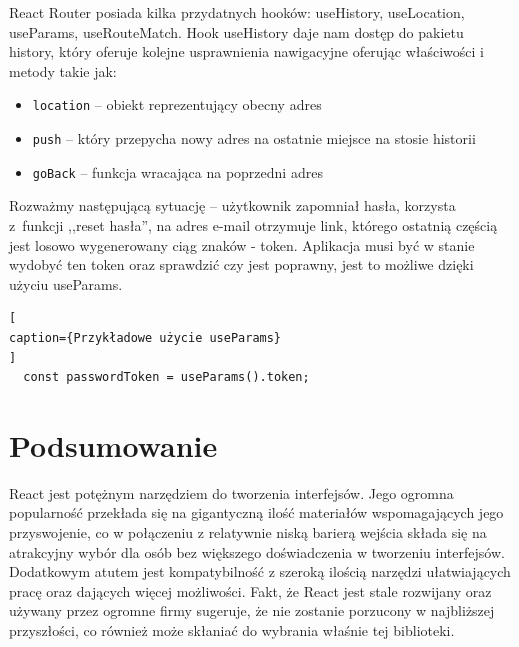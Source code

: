 \documentclass[oneside,polski,logo,indent]{amuthesis}
\begin{document}
React Router posiada kilka przydatnych hooków: useHistory, useLocation, useParams, useRouteMatch. Hook useHistory daje nam dostęp do pakietu history, który oferuje kolejne usprawnienia 
nawigacyjne oferując właściwości i metody takie jak:
\begin{itemize}
\item \texttt{location} -- obiekt reprezentujący obecny adres
\item \texttt{push} -- który przepycha nowy adres na ostatnie miejsce na stosie historii
\item \texttt{goBack} -- funkcja wracająca na poprzedni adres
\end{itemize}
Rozważmy następującą sytuację -- użytkownik zapomniał hasła, korzysta z~funkcji ,,reset hasła'', na adres e-mail otrzymuje link, którego ostatnią częścią
jest losowo wygenerowany ciąg znaków - token. Aplikacja musi być w stanie wydobyć ten token oraz sprawdzić czy jest poprawny, jest to możliwe dzięki użyciu useParams.
\begin{lstlisting}[
caption={Przykładowe użycie useParams}
]
  const passwordToken = useParams().token;
\end{lstlisting}
\section{Podsumowanie}
React jest potężnym narzędziem do tworzenia interfejsów. Jego ogromna popularność przekłada się na gigantyczną ilość materiałów wspomagających jego przyswojenie, co w połączeniu z relatywnie niską barierą wejścia składa się na atrakcyjny wybór dla osób bez większego doświadczenia w tworzeniu interfejsów.
Dodatkowym atutem jest kompatybilność z szeroką ilością narzędzi ułatwiających pracę oraz dających więcej możliwości. Fakt, że React jest stale rozwijany oraz używany przez ogromne firmy
sugeruje, że nie zostanie porzucony w najbliższej przyszłości, co również może skłaniać do wybrania właśnie tej biblioteki.
\nocite{*}
\printbibliography
\end{document}

